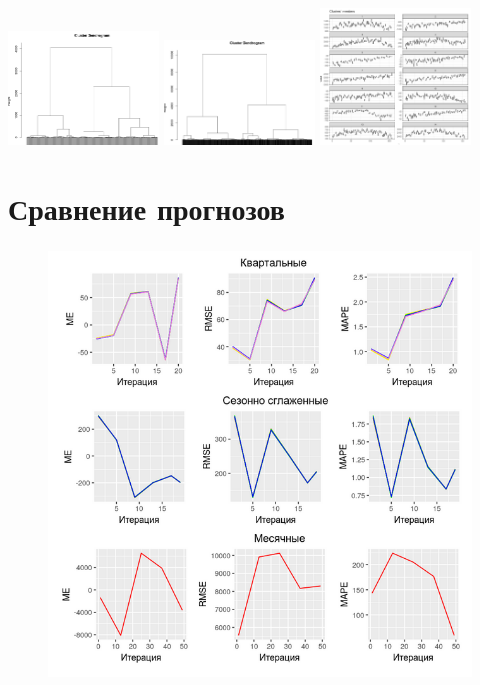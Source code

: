 \documentclass[c, dvipsnames]{beamer}  %
\begin{document}
\begin{frame}[shrink=5]
\hfil\hfil\includegraphics[width=4cm]{screenshot046}\hfil\hfil
\includegraphics[width=4cm]{screenshot049}\hfil\hfil
\includegraphics[width=4cm]{screenshot051}\newline




\end{frame}

\section{Сравнение прогнозов}



\begin{frame}[shrink=5]
\frametitle{\insertsection} 
\framesubtitle{\insertsubsection}



\begin{figure}
	\centering
	\includegraphics[width=0.7\linewidth]{screenshot052}
	\caption{}
	\label{fig:screenshot052}
\end{figure}




\end{frame}
\end{document}
